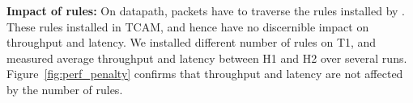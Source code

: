 \textbf{Impact of \sysname{} rules:} On datapath, packets have to traverse the rules installed by \sysname{}.  These
rules installed in TCAM, and hence have no discernible impact on throughput and
latency. We installed different number of \sysname{} rules on T1, and measured
average throughput and latency between H1 and H2 over several runs.
Figure~\ref{fig:perf_penalty} confirms that throughput and latency are not
affected by the number of rules.





%	

%	

